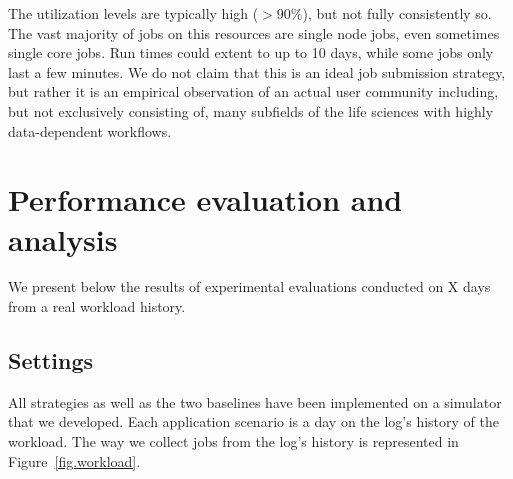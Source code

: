 \documentclass[conference,10pt]{IEEEtran}
\begin{document}
The utilization levels are typically high ($>90\%$), but
not fully consistently so. The vast majority of jobs on this resources are single node jobs, even sometimes single core jobs. Run times
could extent to up to 10 days, while some jobs only last a few minutes. We do not claim that this is an ideal job submission strategy,
but rather it is an empirical observation of an actual user community including, but not exclusively consisting of, many subfields of the life sciences with highly data-dependent workflows.

\section{Performance evaluation and analysis}\label{sec.evaluations}

We present below the results of experimental evaluations conducted 
on X days
from a real workload history.

\subsection{Settings}

All strategies as well as the two baselines have been implemented on
a simulator that we developed. Each application scenario is a day on the log's history of
the workload.
The way we collect jobs from the log's history is represented in Figure~\ref{fig.workload}.
\end{document}
